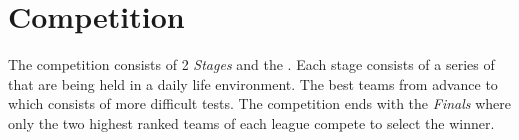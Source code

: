 \section{Competition}
The competition consists of 2 \emph{Stages} and the . Each stage consists of a series of  that are being held in a daily life environment. The best teams from  advance to  which consists of more difficult tests. The competition ends with the \emph{Finals} where only the two highest ranked teams of each league compete to select the winner.
